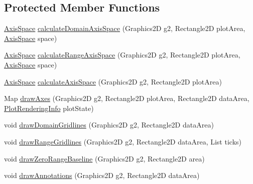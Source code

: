 \subsection*{Protected Member Functions}
\begin{DoxyCompactItemize}
\item 
\mbox{\hyperlink{classorg_1_1jfree_1_1chart_1_1axis_1_1_axis_space}{Axis\+Space}} \mbox{\hyperlink{classorg_1_1jfree_1_1chart_1_1plot_1_1_category_plot_af12a075eb7f83f32b9eb7042729073fa}{calculate\+Domain\+Axis\+Space}} (Graphics2D g2, Rectangle2D plot\+Area, \mbox{\hyperlink{classorg_1_1jfree_1_1chart_1_1axis_1_1_axis_space}{Axis\+Space}} space)
\item 
\mbox{\hyperlink{classorg_1_1jfree_1_1chart_1_1axis_1_1_axis_space}{Axis\+Space}} \mbox{\hyperlink{classorg_1_1jfree_1_1chart_1_1plot_1_1_category_plot_aec96146897411652cb0abc7c760e7bdb}{calculate\+Range\+Axis\+Space}} (Graphics2D g2, Rectangle2D plot\+Area, \mbox{\hyperlink{classorg_1_1jfree_1_1chart_1_1axis_1_1_axis_space}{Axis\+Space}} space)
\item 
\mbox{\hyperlink{classorg_1_1jfree_1_1chart_1_1axis_1_1_axis_space}{Axis\+Space}} \mbox{\hyperlink{classorg_1_1jfree_1_1chart_1_1plot_1_1_category_plot_a4405b0a4f07f3747ccc29e588df4a043}{calculate\+Axis\+Space}} (Graphics2D g2, Rectangle2D plot\+Area)
\item 
Map \mbox{\hyperlink{classorg_1_1jfree_1_1chart_1_1plot_1_1_category_plot_a611a8c57587bb6ab9e1859297eacfd40}{draw\+Axes}} (Graphics2D g2, Rectangle2D plot\+Area, Rectangle2D data\+Area, \mbox{\hyperlink{classorg_1_1jfree_1_1chart_1_1plot_1_1_plot_rendering_info}{Plot\+Rendering\+Info}} plot\+State)
\item 
void \mbox{\hyperlink{classorg_1_1jfree_1_1chart_1_1plot_1_1_category_plot_a5cea274de2420deb353feba3bd91316b}{draw\+Domain\+Gridlines}} (Graphics2D g2, Rectangle2D data\+Area)
\item 
void \mbox{\hyperlink{classorg_1_1jfree_1_1chart_1_1plot_1_1_category_plot_a7a200988686205d3aa4781365c589396}{draw\+Range\+Gridlines}} (Graphics2D g2, Rectangle2D data\+Area, List ticks)
\item 
void \mbox{\hyperlink{classorg_1_1jfree_1_1chart_1_1plot_1_1_category_plot_a0df047e09f29dcf858520c86b6fa9f3d}{draw\+Zero\+Range\+Baseline}} (Graphics2D g2, Rectangle2D area)
\item 
void \mbox{\hyperlink{classorg_1_1jfree_1_1chart_1_1plot_1_1_category_plot_aabaab8e934c95c717a0153b8d83237c1}{draw\+Annotations}} (Graphics2D g2, Rectangle2D data\+Area)

\end{DoxyCompactItemize}
